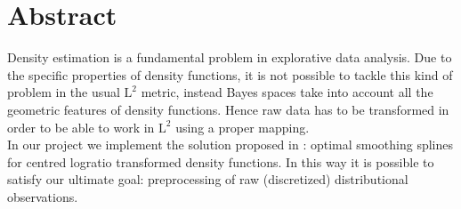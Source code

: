 \newpage
\chapter*{Abstract}


Density estimation is a fundamental problem in explorative data analysis.
Due to the specific properties of density functions, it is not possible to tackle this kind of problem in the usual $\text{L}^2$ metric, instead Bayes spaces take into account all the geometric features of density functions. Hence raw data has to be transformed in order to be able to work in $\text{L}^2$ using a proper mapping.\\
In our project we implement the solution proposed in \citep{paper:pacs}:  optimal smoothing splines for  centred logratio transformed density functions. In this way it is possible to satisfy our ultimate goal: preprocessing of raw (discretized) distributional observations. 


